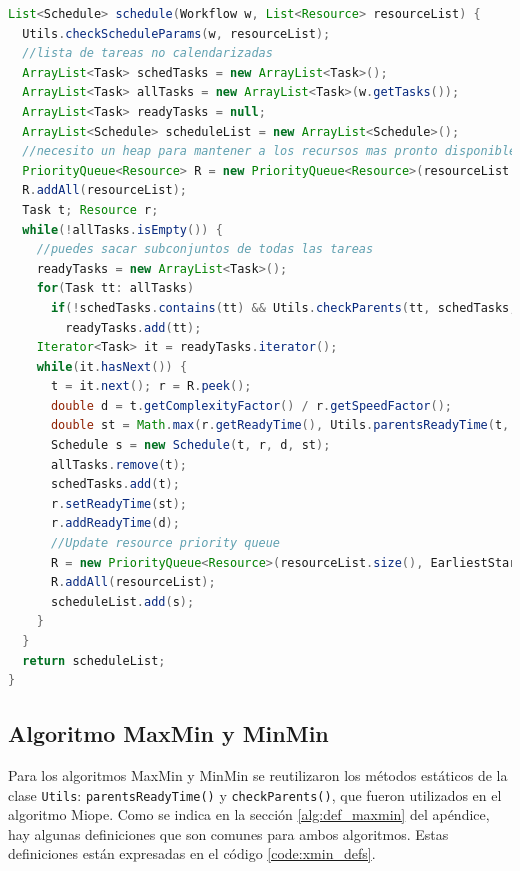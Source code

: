 \begin{lstlisting}[language=java,label={code:myopic},caption={Algoritmo Miope},float]
List<Schedule> schedule(Workflow w, List<Resource> resourceList) {
  Utils.checkScheduleParams(w, resourceList);
  //lista de tareas no calendarizadas
  ArrayList<Task> schedTasks = new ArrayList<Task>();
  ArrayList<Task> allTasks = new ArrayList<Task>(w.getTasks());
  ArrayList<Task> readyTasks = null;
  ArrayList<Schedule> scheduleList = new ArrayList<Schedule>();
  //necesito un heap para mantener a los recursos mas pronto disponibles
  PriorityQueue<Resource> R = new PriorityQueue<Resource>(resourceList.size(), EarliestStartTimeComparator.getComp());
  R.addAll(resourceList);
  Task t; Resource r;
  while(!allTasks.isEmpty()) {
    //puedes sacar subconjuntos de todas las tareas
    readyTasks = new ArrayList<Task>();
    for(Task tt: allTasks)
      if(!schedTasks.contains(tt) && Utils.checkParents(tt, schedTasks, w))
        readyTasks.add(tt);
    Iterator<Task> it = readyTasks.iterator();
    while(it.hasNext()) {
      t = it.next(); r = R.peek();
      double d = t.getComplexityFactor() / r.getSpeedFactor();
      double st = Math.max(r.getReadyTime(), Utils.parentsReadyTime(t, scheduleList, w));
      Schedule s = new Schedule(t, r, d, st);
      allTasks.remove(t);
      schedTasks.add(t);
      r.setReadyTime(st);
      r.addReadyTime(d);
      //Update resource priority queue
      R = new PriorityQueue<Resource>(resourceList.size(), EarliestStartTimeComparator.getComp());
      R.addAll(resourceList);
      scheduleList.add(s);
    }
  }
  return scheduleList;
}
\end{lstlisting}

\subsection{Algoritmo MaxMin y MinMin}
Para los algoritmos MaxMin y MinMin se reutilizaron los métodos estáticos de la clase \texttt{Utils}: \texttt{parentsReadyTime()} y \texttt{checkParents()}, que fueron utilizados en el algoritmo Miope. Como se indica en la sección \ref{alg:def_maxmin} del apéndice, hay algunas definiciones que son comunes para ambos algoritmos. Estas definiciones están expresadas en el código \ref{code:xmin_defs}.

